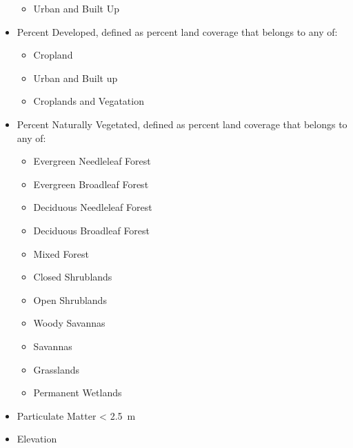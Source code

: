 \documentclass[prl,showpacs,superscriptaddress,twocolumn,longbibliography]{revtex4-1}
\begin{document}
\begin{itemize}
\begin{itemize}
	\item Urban and Built Up\cite{nasa_landcov}
\end{itemize}
\item Percent Developed, defined as percent land coverage that belongs to any of:
\begin{itemize}
	\item Cropland
	\item Urban and Built up
	\item Croplands and Vegatation\cite{nasa_landcov}
\end{itemize}
\item Percent Naturally Vegetated, defined as percent land coverage that belongs to any of:
\begin{itemize}
	\item Evergreen Needleleaf Forest
	\item Evergreen Broadleaf Forest
	\item Deciduous Needleleaf Forest
	\item Deciduous Broadleaf Forest
	\item Mixed Forest
	\item Closed Shrublands
	\item Open Shrublands
	\item Woody Savannas
	\item Savannas
	\item Grasslands
	\item Permanent Wetlands\cite{nasa_landcov}
\end{itemize}
\item Particulate Matter < 2.5~{\textmu}m \cite{van_donkelaar_global_2016}
\item Elevation\cite{nasa_srtm}
\end{itemize}
\end{document}
